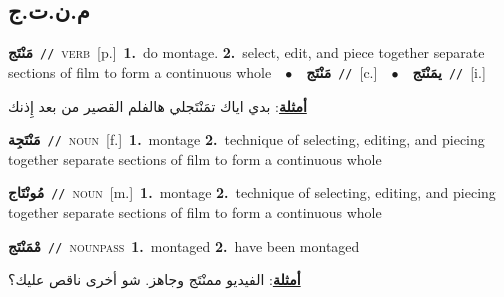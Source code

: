 \documentclass[10pt,a4paper,twoside]{article} %
\begin{document}
\begin{multicols}{2}
\vspace{-3mm}
\subsection*{\color{blue}\foreignlanguage{arabic}{م.ن.ت.ج}\color{blue}{ (ntws)}} 

{\setlength\topsep{0pt}\textbf{\foreignlanguage{arabic}{مَنْتَج}}\ {\color{gray}\texttt{//}\color{black}}\ \textsc{verb}\ [p.]\ \textbf{1.}~do montage.  \textbf{2.}~select, edit, and piece together separate sections of film to form a continuous whole\ \ $\bullet$\ \ \setlength\topsep{0pt}\textbf{\foreignlanguage{arabic}{مَنْتَج}}\ {\color{gray}\texttt{//}\color{black}}\ [c.]\ \ $\bullet$\ \ \setlength\topsep{0pt}\textbf{\foreignlanguage{arabic}{يمَنْتَج}}\ {\color{gray}\texttt{//}\color{black}}\ [i.]\  \begin{flushright}\color{gray}\foreignlanguage{arabic}{\textbf{\underline{\foreignlanguage{arabic}{أمثلة}}}: بدي اياك تمَنْتَجلي هالفلم القصير من بعد إِذنك}\end{flushright}\color{black}} \vspace{2mm}

{\setlength\topsep{0pt}\textbf{\foreignlanguage{arabic}{مَنْتَجِة}}\ {\color{gray}\texttt{//}\color{black}}\ \textsc{noun}\ [f.]\ \textbf{1.}~montage  \textbf{2.}~technique of selecting, editing, and piecing together separate sections of film to form a continuous whole\ } \vspace{2mm}

{\setlength\topsep{0pt}\textbf{\foreignlanguage{arabic}{مُونْتَاج}}\ {\color{gray}\texttt{//}\color{black}}\ \textsc{noun}\ [m.]\ \textbf{1.}~montage  \textbf{2.}~technique of selecting, editing, and piecing together separate sections of film to form a continuous whole\ } \vspace{2mm}

{\setlength\topsep{0pt}\textbf{\foreignlanguage{arabic}{مْمَنْتَج}}\ {\color{gray}\texttt{//}\color{black}}\ \textsc{noun\textunderscore pass}\ \textbf{1.}~montaged  \textbf{2.}~have been montaged\  \begin{flushright}\color{gray}\foreignlanguage{arabic}{\textbf{\underline{\foreignlanguage{arabic}{أمثلة}}}: الفيديو ممنْتَج وجاهز. شو أخرى ناقص عليك؟}\end{flushright}\color{black}} \vspace{2mm}


\end{multicols}
\end{document}
